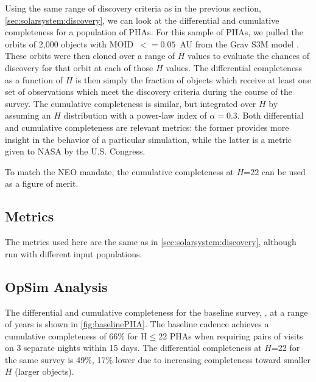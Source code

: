 Using the same range of discovery criteria as in the previous section,
\ref{sec:solarsystem:discovery}, we can look at the differential and
cumulative completeness for a population of PHAs. For this sample of
PHAs, we pulled the orbits of 2,000 objects with MOID~$<= 0.05$~AU from
the Grav S3M model \citep{2011PASP..123..423G}. These orbits were
then cloned over a range of $H$ values to evaluate the chances of
discovery for that orbit at each of those $H$ values. The differential
completeness as a function of $H$ is then simply the fraction of
objects which receive at least one set of observations which meet the
discovery criteria during the course of the survey. The cumulative
completeness is similar, but integrated over $H$ by assuming an $H$
distribution with a power-law index of $\alpha=0.3$. Both
differential and cumulative completeness are relevant metrics: the
former provides more insight in the behavior of a particular
simulation, while the latter is a metric given to NASA by the U.S.
Congress.

To match the NEO mandate, the cumulative completeness at $H$=22 can be
used as a figure of merit.


\subsection{Metrics}
\label{sec:\secname:metrics}

The metrics used here are the same as in
\ref{sec:solarsystem:discovery}, although run with different input populations.


\subsection{OpSim Analysis}
\label{sec:\secname:analysis}

The differential and cumulative completeness for the baseline survey,
, at a range of years is shown in
\autoref{fig:baselinePHA}. The baseline cadence achieves a cumulative completeness of 66\% for
H$\le$22 PHAs when requiring pairs of visits on 3 separate nights within 15 days.
The differential completeness at $H$=22 for the same
survey is 49\%, 17\% lower due to increasing completeness toward
smaller $H$ (larger objects).

